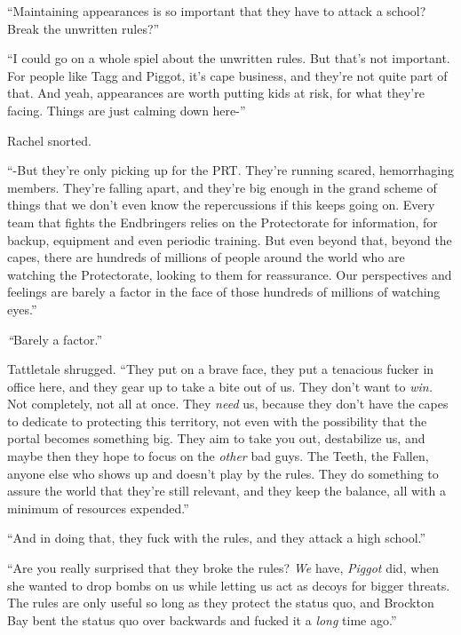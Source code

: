 ``Maintaining appearances is so important that they have to attack a school?  Break the unwritten rules?''



``I could go on a whole spiel about the unwritten rules.  But that's not important.  For people like Tagg and Piggot, it's cape business, and they're not quite part of that.  And yeah, appearances are worth putting kids at risk, for what they're facing.  Things are just calming down here-''



Rachel snorted.



``-But they're only picking up for the PRT.  They're running scared, hemorrhaging members.  They're falling apart, and they're big enough in the grand scheme of things that we don't even know the repercussions if this keeps going on.  Every team that fights the Endbringers relies on the Protectorate for information, for backup, equipment and even periodic training.  But even beyond that, beyond the capes, there are hundreds of millions of people around the world who are watching the Protectorate, looking to them for reassurance.  Our perspectives and feelings are barely a factor in the face of those hundreds of millions of watching eyes.''



\emph{``}Barely a factor.''



Tattletale shrugged.  ``They put on a brave face, they put a tenacious fucker in office here, and they gear up to take a bite out of us.  They don't want to \emph{win. } Not completely, not all at once.\emph{  }They \emph{need} us, because they don't have the capes to dedicate to protecting this territory, not even with the possibility that the portal becomes something big.  They aim to take you out, destabilize us, and maybe then they hope to focus on the \emph{other} bad guys.  The Teeth, the Fallen, anyone else who shows up and doesn't play by the rules.  They do something to assure the world that they're still relevant, and they keep the balance, all with a minimum of resources expended.''



``And in doing that, they fuck with the rules, and they attack a high school.''



``Are you really surprised that they broke the rules?  \emph{We} have, \emph{Piggot} did, when she wanted to drop bombs on us while letting us act as decoys for bigger threats.  The rules are only useful so long as they protect the status quo, and Brockton Bay bent the status quo over backwards and fucked it a \emph{long} time ago.''



